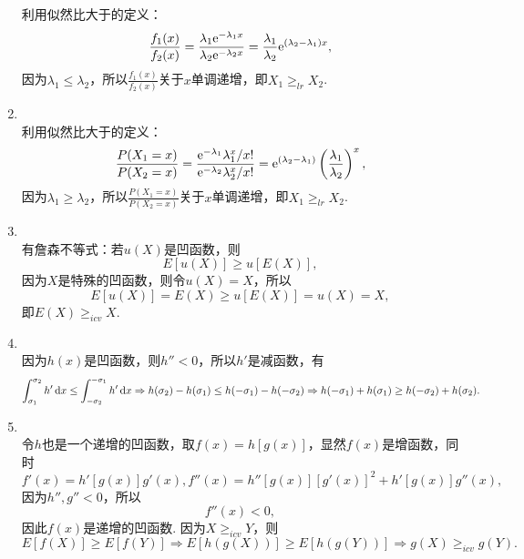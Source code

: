 \begin{enumerate}[label=\arabic{section}.\arabic*]
    利用似然比大于的定义：
    \[\frac{f_1(x)}{f_2(x)}=\frac{\lambda_1\mathrm{e}^{-\lambda_1x}}{\lambda_2\mathrm{e}^{-\lambda_2x}}=\frac{\lambda_1}{\lambda_2}\mathrm{e}^{(\lambda_2-\lambda_1)x},\]
    因为$\lambda_1 \leq \lambda_2$，所以$\displaystyle \frac{f_1(x)}{f_2(x)}$关于$x$单调递增，即$X_1 \geq_{lr} X_2$.
    \item \pro\\
    利用似然比大于的定义：
    \[\frac{P(X_1=x)}{P(X_2=x)}=\frac{\mathrm{e}^{-\lambda_1}\lambda_1^x/x!}{\mathrm{e}^{-\lambda_2}\lambda_2^x/x!}=\mathrm{e}^{(\lambda_2-\lambda_1)}\left(\frac{\lambda_1}{\lambda_2}\right)^x,\]
    因为$\lambda_1 \geq \lambda_2$，所以$\displaystyle \frac{P(X_1=x)}{P(X_2=x)}$关于$x$单调递增，即$X_1 \geq_{lr} X_2$.
    \item \pro\\
    有詹森不等式：若$u(X)$是凹函数，则
    \[E[u(X)] \geq u[E(X)],\]
    因为$X$是特殊的凹函数，则令$u(X)=X$，所以
    \[E[u(X)]=E(X) \geq u[E(X)]=u(X)=X,\]
    即$E(X) \geq_{icv} X$.
    \item \pro\\
    因为$h(x)$是凹函数，则$h''<0$，所以$h'$是减函数，有
    \[\int_{\sigma_1}^{\sigma_2} h'\,\mathrm{d} x \leq \int_{-\sigma_2}^{-\sigma_1} h'\,\mathrm{d} x \Rightarrow h(\sigma_2)-h(\sigma_1) \leq h(-\sigma_1)-h(-\sigma_2) \Rightarrow h(-\sigma_1)+h(\sigma_1) \geq h(-\sigma_2)+h(\sigma_2).\]
    \item \pro\\
    令$h$也是一个递增的凹函数，取$f(x)=h[g(x)]$，显然$f(x)$是增函数，同时
    \[f'(x)=h'[g(x)]g'(x),f''(x)=h''[g(x)][g'(x)]^2+h'[g(x)]g''(x),\]
    因为$h'',g''<0$，所以\[f''(x)<0,\]
    因此$f(x)$是递增的凹函数. 因为$X \geq_{icv} Y$，则
    \[E[f(X)] \geq E[f(Y)] \Rightarrow E[h(g(X))] \geq E[h(g(Y))] \Rightarrow g(X) \geq_{icv} g(Y).\]
\end{enumerate}
\clearpage